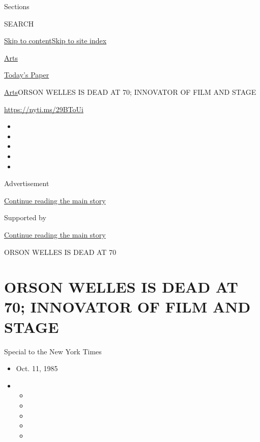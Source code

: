 Sections

SEARCH

\protect\hyperlink{site-content}{Skip to
content}\protect\hyperlink{site-index}{Skip to site index}

\href{https://www.nytimes.com/section/arts}{Arts}

\href{https://myaccount.nytimes.com/auth/login?response_type=cookie\&client_id=vi}{}

\href{https://www.nytimes.com/section/todayspaper}{Today's Paper}

\href{/section/arts}{Arts}\textbar{}ORSON WELLES IS DEAD AT 70;
INNOVATOR OF FILM AND STAGE

\href{https://nyti.ms/29BToUi}{https://nyti.ms/29BToUi}

\begin{itemize}
\item
\item
\item
\item
\item
\end{itemize}

Advertisement

\protect\hyperlink{after-top}{Continue reading the main story}

Supported by

\protect\hyperlink{after-sponsor}{Continue reading the main story}

ORSON WELLES IS DEAD AT 70

\hypertarget{orson-welles-is-dead-at-70-innovator-of-film-and-stage}{%
\section{ORSON WELLES IS DEAD AT 70; INNOVATOR OF FILM AND
STAGE}\label{orson-welles-is-dead-at-70-innovator-of-film-and-stage}}

Special to the New York Times

\begin{itemize}
\item
  Oct. 11, 1985
\item
  \begin{itemize}
  \item
  \item
  \item
  \item
  \item
  \end{itemize}
\end{itemize}

